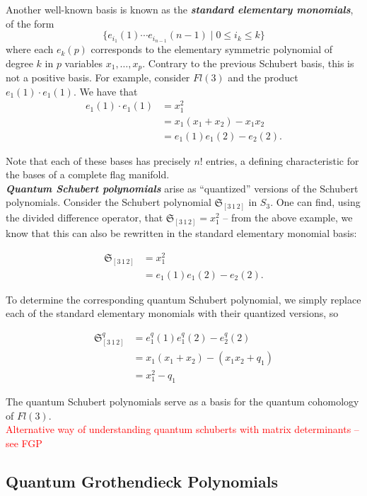 Another well-known basis is known as the \textbf{\textit{standard elementary monomials}}, of the form
\[
    \{e_{i_1}(1) \cdots e_{i_{n-1}}(n-1) \mid 0 \leq i_k \leq k \}
\]
where each $e_k(p)$ corresponds to the elementary symmetric polynomial of degree $k$ in $p$ variables $x_1, \dots, x_p$. Contrary to the previous Schubert basis, this is not a positive basis. For example, consider $Fl(3)$ and the product $e_1(1) \cdot e_1(1).$ We have that
\begin{align*}
    e_1(1) \cdot e_1(1) &= x_1^2 \\
    &= x_1(x_1 + x_2) - x_1x_2 \\
    &= e_1(1)e_1(2) - e_2(2).
\end{align*}

Note that each of these bases has precisely $n!$ entries, a defining characteristic for the bases of a complete flag manifold. \\

\textbf{\textit{Quantum Schubert polynomials}} arise as ``quantized'' versions of the Schubert polynomials. Consider the Schubert polynomial $\mathfrak{S}_{[3 \, 1 \, 2]}$ in $S_3$. One can find, using the divided difference operator, that $\mathfrak{S}_{[3 \, 1 \, 2]} = x_1^2$ -- from the above example, we know that this can also be rewritten in the standard elementary monomial basis:

\begin{align*}
    \mathfrak{S}_{[3 \, 1 \, 2]} &= x_1^2 \\
    &= e_1(1) e_1(2) - e_2(2).
\end{align*}

To determine the corresponding quantum Schubert polynomial, we simply replace each of the standard elementary monomials with their quantized versions, so

\begin{align*}
    \mathfrak{S}_{[3 \, 1 \, 2]}^q &= e_1^q(1) e_1^q(2) - e_2^q(2) \\
    &= x_1(x_1 + x_2) - (x_1x_2 + q_1) \\
    &= x_1^2 - q_1
\end{align*}

The quantum Schubert polynomials serve as a basis for the quantum cohomology of $Fl(3)$. \\

\textcolor{red}{Alternative way of understanding quantum schuberts with matrix determinants -- see FGP}

\subsection{Quantum Grothendieck Polynomials}

